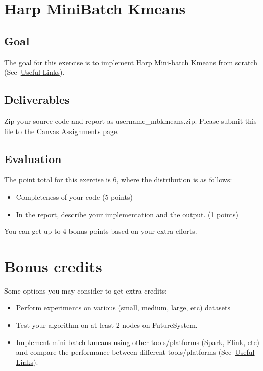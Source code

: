 \section*{Harp Mini\-Batch Kmeans}

\subsection*{Goal}

The goal for this exercise is to implement Harp Mini-batch Kmeans
from scratch (See~\hyperlink{link_project8}{Useful Links}). 

\subsection*{Deliverables}
Zip your source code and report as username\_mbkmeans.zip. Please submit this
file to the Canvas Assignments page.

\subsection*{Evaluation}

The point total for this exercise is 6, where the distribution is as
follows:

\begin{itemize}
\item Completeness of your code (5 points)
\item In the report, describe your implementation and the output. (1 points)
\end{itemize}

You can get up to 4 bonus points based on your extra efforts.

\section*{Bonus credits}

Some options you may consider to get extra credits: 

\begin{itemize}
\item Perform experiments on various (small, medium, large, etc)
  datasets
\item Test your algorithm on at least 2 nodes on FutureSystem.
\item Implement mini-batch kmeans using other tools/platforms (Spark,
  Flink, etc) and compare the performance between different
  tools/platforms (See~\hyperlink{link_project8}{Useful Links}).
\end{itemize}


